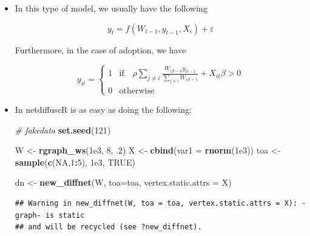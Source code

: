 \documentclass[
]{book}
\newenvironment{Shaded}{\begin{snugshade}}{\end{snugshade}}
\newcommand{\AttributeTok}[1]{\textcolor[rgb]{0.13,0.29,0.53}{#1}}
\newcommand{\CommentTok}[1]{\textcolor[rgb]{0.56,0.35,0.01}{\textit{#1}}}
\newcommand{\ConstantTok}[1]{\textcolor[rgb]{0.56,0.35,0.01}{#1}}
\newcommand{\DecValTok}[1]{\textcolor[rgb]{0.00,0.00,0.81}{#1}}
\newcommand{\FloatTok}[1]{\textcolor[rgb]{0.00,0.00,0.81}{#1}}
\newcommand{\FunctionTok}[1]{\textcolor[rgb]{0.13,0.29,0.53}{\textbf{#1}}}
\newcommand{\NormalTok}[1]{#1}
\newcommand{\OtherTok}[1]{\textcolor[rgb]{0.56,0.35,0.01}{#1}}
\newcommand{\SpecialCharTok}[1]{\textcolor[rgb]{0.81,0.36,0.00}{\textbf{#1}}}
\newcommand{\StringTok}[1]{\textcolor[rgb]{0.31,0.60,0.02}{#1}}
\begin{document}
\begin{itemize}
\item
  In this type of model, we usually have the following

  \[
  y_t = f(W_{t-1}, y_{t-1}, X_i) + \varepsilon
  \]

  Furthermore, in the case of adoption, we have

  \[
  y_{it} = \left\{
  \begin{array}{ll}
  1 & \mbox{if}\quad \rho\sum_{j\neq i}\frac{W_{ijt-1}y_{it-1}}{\sum_{j\neq i}W_{ijt-1}} + X_{it}\beta > 0\\
  0 & \mbox{otherwise}
  \end{array}
  \right.
  \]
\item
  In netdiffuseR is as easy as doing the following:

\begin{Shaded}
\begin{Highlighting}[]
\CommentTok{\# fakedata}
\FunctionTok{set.seed}\NormalTok{(}\DecValTok{121}\NormalTok{)}

\NormalTok{W   }\OtherTok{\textless{}{-}} \FunctionTok{rgraph\_ws}\NormalTok{(}\FloatTok{1e3}\NormalTok{, }\DecValTok{8}\NormalTok{, .}\DecValTok{2}\NormalTok{)}
\NormalTok{X   }\OtherTok{\textless{}{-}} \FunctionTok{cbind}\NormalTok{(}\AttributeTok{var1 =} \FunctionTok{rnorm}\NormalTok{(}\FloatTok{1e3}\NormalTok{))}
\NormalTok{toa }\OtherTok{\textless{}{-}} \FunctionTok{sample}\NormalTok{(}\FunctionTok{c}\NormalTok{(}\ConstantTok{NA}\NormalTok{,}\DecValTok{1}\SpecialCharTok{:}\DecValTok{5}\NormalTok{), }\FloatTok{1e3}\NormalTok{, }\ConstantTok{TRUE}\NormalTok{)}

\NormalTok{dn  }\OtherTok{\textless{}{-}} \FunctionTok{new\_diffnet}\NormalTok{(W, }\AttributeTok{toa=}\NormalTok{toa, }\AttributeTok{vertex.static.attrs =}\NormalTok{ X)}
\end{Highlighting}
\end{Shaded}

\begin{verbatim}
## Warning in new_diffnet(W, toa = toa, vertex.static.attrs = X): -graph- is static
## and will be recycled (see ?new_diffnet).
\end{verbatim}

\begin{Shaded}
\end{Shaded}
\end{itemize}
\end{document}
